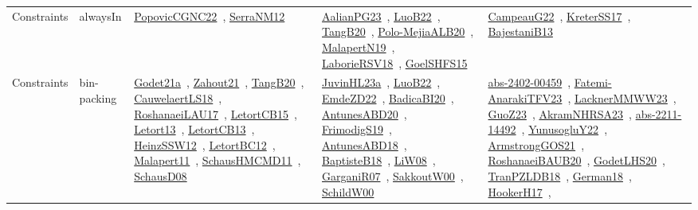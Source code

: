 {\begin{longtable}{lp{3cm}>{\raggedright\arraybackslash}p{6cm}>{\raggedright\arraybackslash}p{6cm}>{\raggedright\arraybackslash}p{8cm}}
Constraints & alwaysIn & \href{works/PopovicCGNC22.pdf}{PopovicCGNC22}~\cite{PopovicCGNC22}, \href{works/SerraNM12.pdf}{SerraNM12}~\cite{SerraNM12} & \href{works/AalianPG23.pdf}{AalianPG23}~\cite{AalianPG23}, \href{works/LuoB22.pdf}{LuoB22}~\cite{LuoB22}, \href{works/TangB20.pdf}{TangB20}~\cite{TangB20}, \href{works/Polo-MejiaALB20.pdf}{Polo-MejiaALB20}~\cite{Polo-MejiaALB20}, \href{works/MalapertN19.pdf}{MalapertN19}~\cite{MalapertN19}, \href{works/LaborieRSV18.pdf}{LaborieRSV18}~\cite{LaborieRSV18}, \href{works/GoelSHFS15.pdf}{GoelSHFS15}~\cite{GoelSHFS15} & \href{works/CampeauG22.pdf}{CampeauG22}~\cite{CampeauG22}, \href{works/KreterSS17.pdf}{KreterSS17}~\cite{KreterSS17}, \href{works/BajestaniB13.pdf}{BajestaniB13}~\cite{BajestaniB13}\\
Constraints & bin-packing & \href{works/Godet21a.pdf}{Godet21a}~\cite{Godet21a}, \href{works/Zahout21.pdf}{Zahout21}~\cite{Zahout21}, \href{works/TangB20.pdf}{TangB20}~\cite{TangB20}, \href{works/CauwelaertLS18.pdf}{CauwelaertLS18}~\cite{CauwelaertLS18}, \href{works/RoshanaeiLAU17.pdf}{RoshanaeiLAU17}~\cite{RoshanaeiLAU17}, \href{works/LetortCB15.pdf}{LetortCB15}~\cite{LetortCB15}, \href{works/Letort13.pdf}{Letort13}~\cite{Letort13}, \href{works/LetortCB13.pdf}{LetortCB13}~\cite{LetortCB13}, \href{works/HeinzSSW12.pdf}{HeinzSSW12}~\cite{HeinzSSW12}, \href{works/LetortBC12.pdf}{LetortBC12}~\cite{LetortBC12}, \href{works/Malapert11.pdf}{Malapert11}~\cite{Malapert11}, \href{works/SchausHMCMD11.pdf}{SchausHMCMD11}~\cite{SchausHMCMD11}, \href{works/SchausD08.pdf}{SchausD08}~\cite{SchausD08} & \href{works/JuvinHL23a.pdf}{JuvinHL23a}~\cite{JuvinHL23a}, \href{works/LuoB22.pdf}{LuoB22}~\cite{LuoB22}, \href{works/EmdeZD22.pdf}{EmdeZD22}~\cite{EmdeZD22}, \href{works/BadicaBI20.pdf}{BadicaBI20}~\cite{BadicaBI20}, \href{works/AntunesABD20.pdf}{AntunesABD20}~\cite{AntunesABD20}, \href{works/FrimodigS19.pdf}{FrimodigS19}~\cite{FrimodigS19}, \href{works/AntunesABD18.pdf}{AntunesABD18}~\cite{AntunesABD18}, \href{works/BaptisteB18.pdf}{BaptisteB18}~\cite{BaptisteB18}, \href{works/LiW08.pdf}{LiW08}~\cite{LiW08}, \href{works/GarganiR07.pdf}{GarganiR07}~\cite{GarganiR07}, \href{works/SakkoutW00.pdf}{SakkoutW00}~\cite{SakkoutW00}, \href{works/SchildW00.pdf}{SchildW00}~\cite{SchildW00} & \href{works/abs-2402-00459.pdf}{abs-2402-00459}~\cite{abs-2402-00459}, \href{works/Fatemi-AnarakiTFV23.pdf}{Fatemi-AnarakiTFV23}~\cite{Fatemi-AnarakiTFV23}, \href{works/LacknerMMWW23.pdf}{LacknerMMWW23}~\cite{LacknerMMWW23}, \href{works/GuoZ23.pdf}{GuoZ23}~\cite{GuoZ23}, \href{works/AkramNHRSA23.pdf}{AkramNHRSA23}~\cite{AkramNHRSA23}, \href{works/abs-2211-14492.pdf}{abs-2211-14492}~\cite{abs-2211-14492}, \href{works/YunusogluY22.pdf}{YunusogluY22}~\cite{YunusogluY22}, \href{works/ArmstrongGOS21.pdf}{ArmstrongGOS21}~\cite{ArmstrongGOS21}, \href{works/RoshanaeiBAUB20.pdf}{RoshanaeiBAUB20}~\cite{RoshanaeiBAUB20}, \href{works/GodetLHS20.pdf}{GodetLHS20}~\cite{GodetLHS20}, \href{works/TranPZLDB18.pdf}{TranPZLDB18}~\cite{TranPZLDB18}, \href{works/German18.pdf}{German18}~\cite{German18}, \href{works/HookerH17.pdf}{HookerH17}~\cite{HookerH17}, 
\end{longtable}}
